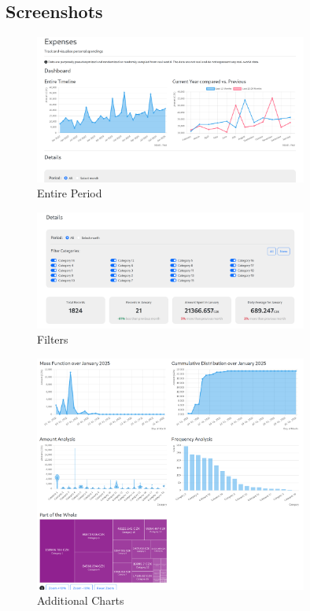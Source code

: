 \documentclass{article}
\begin{document}
    \subsection*{Screenshots}
        \begin{figure}[h]
            \centering
            \includegraphics[width=0.8\textwidth]{image1.png}
            \caption{Entire Period}
        \end{figure}
        \begin{figure}
            \centering
            \includegraphics[width=0.8\textwidth]{image2.png}
            \caption{Filters}
        \end{figure}
        \begin{figure}
            \centering
            \includegraphics[width=0.8\textwidth]{image3.png}
            \caption{Additional Charts}
        \end{figure}
\end{document}
